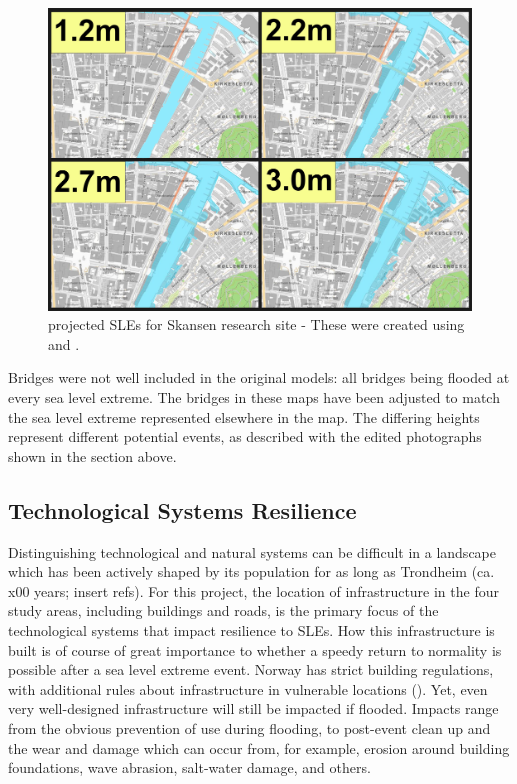 \begin{figure}[H]
    \centering
    \includegraphics[width=16cm]{fig_sle/nidelva-sle-num.png}
    \caption{projected SLEs for Skansen research site - These were created using \cite{kartverket_se_2021} and \cite{stormflo_database_stormflo_2021}. }
    \label{fig:sle_nidelva_num}
\end{figure}

 Bridges were not well included in the original models: all bridges being flooded at every sea level extreme. The bridges in these maps have been adjusted to match the sea level extreme represented elsewhere in the map. The differing heights represent different potential events,  as described with the edited photographs shown in the section above. 

\subsection{Technological Systems Resilience}
Distinguishing technological and natural systems can be difficult in a landscape which has been actively shaped by its population for as long as Trondheim (ca. x00 years; insert refs). For this project, the location of infrastructure in the four study areas, including buildings and roads, is the primary focus of the technological systems that impact resilience to SLEs. How this infrastructure is built is of course of great importance to whether a speedy return to normality is possible after a sea level extreme event. Norway has strict building regulations, with additional rules about infrastructure in vulnerable locations (\cite{direktoratet_for_byggkvalitet_direktoratet_nodate}). Yet, even very well-designed infrastructure will still be impacted if flooded. Impacts range from the obvious prevention of use during flooding, to post-event clean up and the wear and damage which can occur from, for example,  erosion around building foundations, wave abrasion, salt-water damage, and others.
